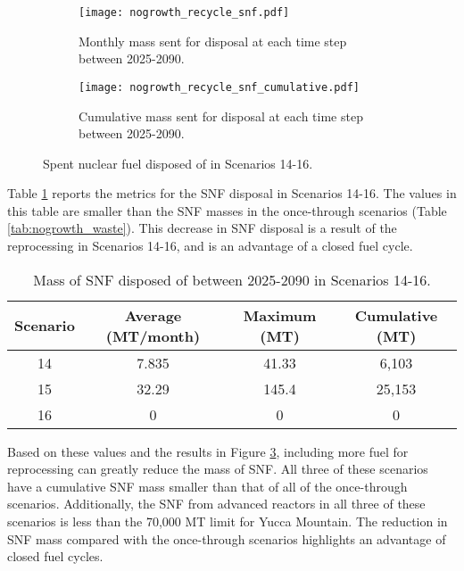 \begin{figure}[h!]
    \centering
    \begin{subfigure}[b]{0.49\textwidth}
        \centering
        \texttt{[image: nogrowth\_recycle\_snf.pdf]}
        \caption{Monthly mass sent for disposal 
        at each time step between 2025-2090.}
        \label{fig:nogrowth_recycle_snf_all}
    \end{subfigure}
    \hfill
    \begin{subfigure}[b]{0.49\textwidth}
        \centering
        \texttt{[image: nogrowth\_recycle\_snf\_cumulative.pdf]}
        \caption{Cumulative mass sent for disposal 
        at each time step between 2025-2090.}
        \label{fig:nogrowth_recycle_snf_cumulative}
    \end{subfigure}
       \caption{Spent nuclear fuel disposed of in Scenarios 14-16.}
       \label{fig:nogrowth_recycle_snf}
\end{figure}

Table \ref{tab:s14-16_snf} reports the metrics for the \gls{SNF} disposal 
in Scenarios 14-16. The values in this table are smaller than 
the \gls{SNF} masses in the once-through scenarios (Table 
\ref{tab:nogrowth_waste}). This decrease in \gls{SNF} disposal is 
a result of the reprocessing in Scenarios 14-16, and is an 
advantage of a closed fuel cycle. 

\begin{table}[h!]
    \centering 
    \caption{Mass of SNF disposed of between 2025-2090 in 
    Scenarios 14-16.}
    \label{tab:s14-16_snf}
    \begin{tabular}{c c c c}
        \hline 
        Scenario & Average (MT/month) & Maximum (MT) & Cumulative (MT) \\
        \hline
        14 & 7.835 & 41.33 & 6,103\\
        15 & 32.29 & 145.4 & 25,153 \\
        16 & 0 & 0 & 0 \\
        \hline
    \end{tabular}
\end{table}

Based on these values and the results in 
Figure \ref{fig:nogrowth_recycle_snf}, including more fuel for 
reprocessing can greatly reduce the mass of \gls{SNF}. All three of 
these scenarios have a cumulative \gls{SNF} mass smaller than 
that of all of the once-through scenarios. Additionally, 
the \gls{SNF} from advanced reactors in all three of these scenarios 
is less than the 70,000 MT limit for Yucca Mountain. The reduction in 
\gls{SNF} mass compared with the once-through scenarios highlights 
an advantage of closed fuel cycles. 

